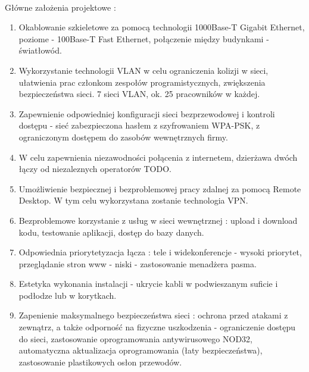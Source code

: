 \paragraph{}
Główne założenia projektowe :
\begin{enumerate}
	\item Okablowanie szkieletowe za pomocą technologii 1000Base-T Gigabit Ethernet, poziome - 100Base-T Fast Ethernet, połączenie między budynkami - światłowód.
	\item Wykorzystanie technologii VLAN w celu ograniczenia kolizji  w sieci, ułatwienia prac członkom zespołów programistycznych, zwiększenia bezpieczeństwa sieci. 7 sieci VLAN, ok. 25 pracowników w każdej.
	\item Zapewnienie odpowiedniej konfiguracji sieci bezprzewodowej i kontroli dostępu - sieć zabezpieczona hasłem z szyfrowaniem WPA-PSK, z ograniczonym dostępem do zasobów wewnętrznych firmy.
	\item W celu zapewnienia niezawodności połącenia z internetem, dzierżawa dwóch łączy od niezaleznych operatorów TODO.
	\item Umożliwienie bezpiecznej i bezproblemowej pracy zdalnej za pomocą Remote Desktop. W tym celu wykorzystana zostanie technologia VPN.
	\item Bezproblemowe korzystanie z usług w sieci wewnętrznej : upload i download kodu, testowanie aplikacji, dostęp do bazy danych.
	\item Odpowiednia priorytetyzacja łącza : tele i widekonferencje - wysoki priorytet, przeglądanie stron www - niski - zastosowanie menadżera pasma.
	\item Estetyka wykonania instalacji - ukrycie kabli w podwieszanym suficie i podłodze lub w korytkach.
	\item Zapenienie maksymalnego bezpieczeństwa sieci : ochrona przed atakami z zewnątrz, a także odporność na fizyczne uszkodzenia - ograniczenie dostępu do sieci, zastosowanie oprogramowania antywirusowego NOD32, automatyczna aktualizacja oprogramowania (łaty bezpieczeństwa), zastosowanie plastikowych osłon przewodów.
\end{enumerate}
